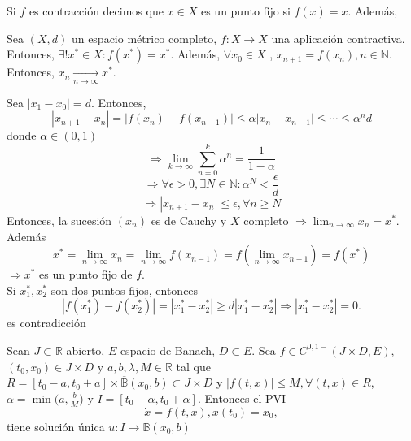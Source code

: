 \begin{obs}
  Si $f$ es contracción decimos que $x \in X$ es un punto fijo si $f(x) = x$. Además, 
\end{obs}

\begin{theo}
  Sea $(X, d)$ un espacio métrico completo, $f: X \to X$ una aplicación contractiva. Entonces, $\exists ! x^* \in X : f(x^*) = x^*$. Además, $\forall x_{0} \in X$ , $x_{n+1} = f(x_{n}), n \in \mathbb{N}$. Entonces, $x_{n} \xrightarrow[ n \rightarrow \infty ]{} x^*$.
\end{theo}

\begin{dem}
  Sea $| x_{1} - x_{0} | = d$. Entonces, 
  \[ 
    | x_{n+1} - x_{n} | = | f(x_{n}) - f(x_{n-1}) | \leq \alpha | x_{n} - x_{n-1} |\leq \cdots \leq \alpha^n d
  \] 
  donde $\alpha \in (0,1)$ 
  \[
    \Rightarrow \lim_{k \to \infty}\sum_{n=0}^{k} \alpha^n = \frac{1}{1 - \alpha}
  \]
  \[
    \Rightarrow \forall \epsilon > 0, \exists N \in \mathbb{N}: \alpha^N < \frac{\epsilon}{d}
  \]
  \[ 
    \Rightarrow | x_{n+1} - x_{n} | \leq \epsilon, \forall n \geq N
  \] 
  Entonces, la sucesión $(x_{n})$ es de Cauchy y $X$ completo $\Rightarrow \lim_{n \to \infty} x_{n} = x^*$. Además
  \[ 
    x^* = \lim_{n \to \infty} x_{n} = \lim_{n \to \infty} f(x_{n-1}) = f( \lim_{n \to \infty} x_{n-1}) = f(x^*)
  \] 
  $\Rightarrow x^*$ es un punto fijo de $f$. \\

  Si $x_{1}^*, x_{2}^*$ son dos puntos fijos, entonces
  \[ 
    | f(x_{1}^*) - f(x_{2}^*) | = | x_{1}^* - x_{2}^* | \geq d | x_{1}^* - x_{2}^* | \Rightarrow | x_{1}^* - x_{2}^* | = 0.
  \] 
  es contradicción
\end{dem}

\begin{theo}
  Sean $J \subset \mathbb{R}$ abierto, $E$ espacio de Banach, $D \subset E$. Sea $f \in C^{0,1-}( J \times D, E)$, $(t_{0}, x_{0}) \in J \times D$ y $a, b, \lambda, M \in \mathbb{R}$ tal que $R = [t_{0} - a, t_{0} + a] \times \overline{\mathbb{B}}(x_{0}, b) \subset J \times D$ y $| f(t,x) |\leq M, \forall (t,x) \in R$, $\alpha = \min\big ( a, \frac{b}{M} \big )$ y $I = [t_{0} - \alpha, t_{0} +\alpha]$. Entonces el PVI
  \[ 
    \dot{x} = f(t, x), x(t_{0}) = x_{0}, 
  \] 
  tiene solución única $u: I \to \mathbb{B}(x_{0}, b)$
\end{theo}

